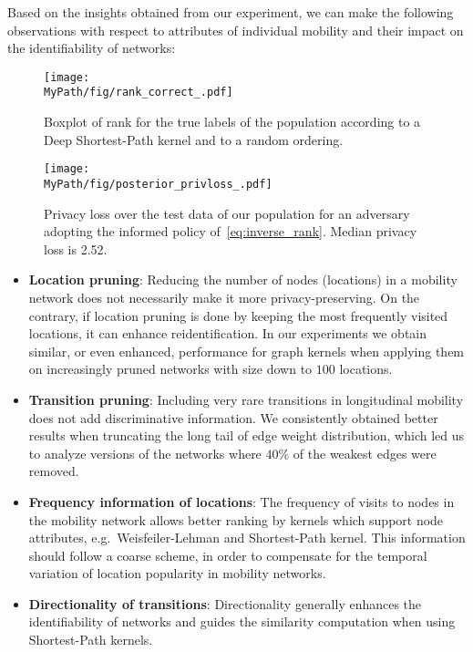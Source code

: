 Based on the insights obtained from our experiment, we can make the following observations with respect to attributes of individual mobility and their impact on the identifiability of networks:
%

\begin{figure*}[]
	\centering
	\begin{minipage}[b]{.45\textwidth}
		\texttt{[image: \\MyPath/fig/rank\_correct\_.pdf]}
		\caption{{Boxplot of rank for the true labels of the population according to a Deep Shortest-Path kernel and to a random ordering.}}
		\label{fig:rank_correct}
	\end{minipage}\qquad
	\begin{minipage}[b]{.45\textwidth}
		\texttt{[image: \\MyPath/fig/posterior\_privloss\_.pdf]}
		\centering \caption{{Privacy loss over the test data of our population for an adversary adopting the informed policy of~\eqref{eq:inverse_rank}. Median privacy loss is 2.52.}}
		\label{fig:privloss}
	\end{minipage}
\end{figure*}


\begin{itemize}
	\item \textbf{Location pruning}: Reducing the number of nodes (locations) in a mobility network does not necessarily make it more privacy-preserving.
	On the contrary, if location pruning is done by keeping the most frequently visited locations, it can enhance reidentification.
	In our experiments we obtain similar, or even enhanced, performance for graph kernels when applying them on increasingly pruned networks with size down to $100$ locations.

	\item \textbf{Transition pruning}: Including very rare transitions in longitudinal mobility does not add discriminative information.
	We consistently obtained better results when truncating the long tail of edge weight distribution, which led us to analyze versions of the networks where $40\%$ of the weakest edges were removed.
	\item \textbf{Frequency information of locations}: The frequency of visits to nodes in the mobility network allows better ranking by kernels which support node attributes, e.g.\ Weisfeiler-Lehman and Shortest-Path kernel.
	This information should follow a coarse scheme, in order to compensate for the temporal variation of location popularity in mobility networks.
	\item \textbf{Directionality of transitions}: Directionality generally enhances the identifiability of networks and guides the similarity computation when using Shortest-Path kernels.
\end{itemize}

